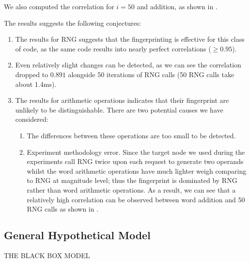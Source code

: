 We also computed the correlation for $i=50$ and addition, as shown in .

The results suggests the following conjectures:
\begin{enumerate}
\item The results for RNG suggests that the fingerprinting is effective for this class of code, as the same code results into nearly perfect correlations ($\geq 0.95$).

\item Even relatively slight changes can be detected, as we can see the correlation dropped to $0.891$ alongside 50 iterations of RNG calls (50 RNG calls take about 1.4ms).

\item The results for arithmetic operations indicates that their  fingerprint are unlikely to be distinguishable. There are two potential causes we have considered:
\begin{enumerate}
\item The differences between these operations are too small to be detected.

\item Experiment methodology error. Since the target node we used during the experiments call RNG twice upon each request to generate two operands whilst the word arithmetic operations have much lighter weigh comparing to RNG at magnitude level; thus the fingerprint is dominated by RNG rather than word arithmetic operations. As a result, we can see that a relatively high correlation can be observed between word addition and 50 RNG calls as shown in .
\end{enumerate}
\end{enumerate}

\subsection{General Hypothetical Model}
THE BLACK BOX MODEL